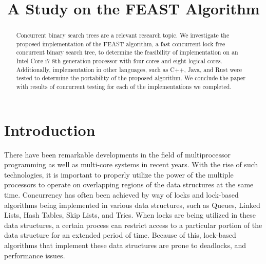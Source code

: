 \documentclass[conference]{IEEEtran}
\begin{document}
\title{A Study on the FEAST Algorithm\\
}
\author{
\and
{}
\and
{}
\and
{}
}
\maketitle

\begin{abstract}
Concurrent binary search trees are a relevant research topic. We investigate the proposed implementation of the FEAST algorithm, a fast concurrent lock free concurrent binary search tree, to determine the feasibility of implementation on an Intel Core i7 8th generation processor with four cores and eight logical cores. Additionally, implementation in other languages, such as C++, Java, and Rust were tested to determine the portability of the proposed algorithm. We conclude the paper with results of concurrent testing for each of the implementations we completed. 
\end{abstract}

\section{Introduction}
There have been remarkable developments in the field of multiprocessor programming as well as multi-core systems in recent years. With the rise of such technologies, it is important to properly utilize the power of the multiple processors to operate on overlapping regions of the data structures at the same time. Concurrency has often been achieved by way of locks and lock-based algorithms being implemented in various data structures, such as Queues, Linked Lists, Hash Tables, Skip Lists, and Tries. When locks are being utilized in these data structures, a certain process can restrict access to a particular portion of the data structure for an extended period of time. Because of this, lock-based algorithms that implement these data structures are prone to deadlocks, and performance issues. 
\end{document}
